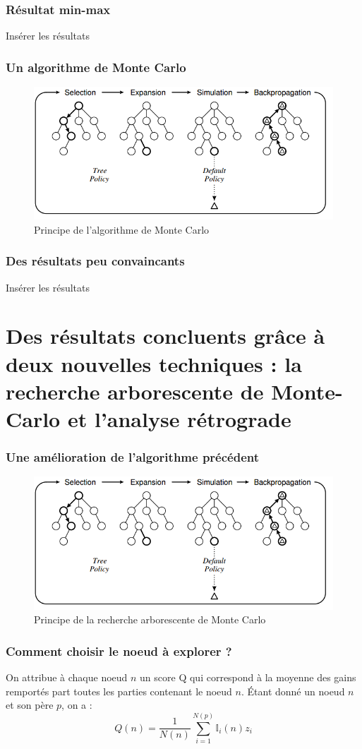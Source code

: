 \documentclass{beamer}
\begin{document}
\begin{frame}
  \frametitle{Résultat min-max}
  Insérer les résultats
\end{frame}

\begin{frame}
  \frametitle{Un algorithme de Monte Carlo}
  \begin{figure}
    \centering
    \includegraphics[width=\linewidth]{ressources/monte_carlo_explication.png}
    \caption{Principe de l'algorithme de Monte Carlo}
  \end{figure}
\end{frame}

\begin{frame}
  \frametitle{Des résultats peu convaincants}
  Insérer les résultats
\end{frame}

\section{Des résultats concluents grâce à deux nouvelles techniques : la recherche arborescente de Monte-Carlo et l'analyse rétrograde}
\begin{frame}
  \frametitle{Une amélioration de l'algorithme précédent}
  \begin{figure}
    \centering
    \includegraphics[width=\linewidth]{ressources/monte_carlo_explication.png}
    \caption{Principe de la recherche arborescente de Monte Carlo}
  \end{figure}
\end{frame}

\begin{frame}
  \frametitle{Comment choisir le noeud à explorer ?}
  On attribue à chaque noeud $n$ un score Q qui correspond à la moyenne des gains remportés part toutes les parties contenant le noeud $n$. Étant donné un noeud $n$ et son père $p$, on a :
  $$ Q(n) = \frac 1 {N(n)} \sum_{i=1}^{N(p)}\mathbb I_i(n)z_i $$
\end{frame}
\end{document}
